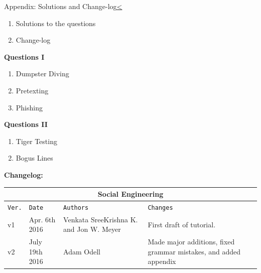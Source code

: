 \documentclass[12pt]{extarticle}
\newenvironment{instructionblock}{\Large\bgroup}{\egroup}
\newcommand{\ben}{\begin{enumerate}}
\newcommand{\een}{\end{enumerate}}
\begin{document}
\begin{slide}{Appendix: Solutions and Change-log}{\hyperref[slide 14]{\textless}}
	\begin{instructionblock}
		\begin{enumerate}
			\item {Solutions to the questions}
				
			\item {Change-log}
		\end{enumerate}
	\end{instructionblock}
\end{slide}

\textbf{Questions I}
\ben
	\item Dumpster Diving
	\item Pretexting
	\item Phishing 
\een

\textbf{Questions II}

\ben
	\item Tiger Testing
	\item Bogus Lines
\een

	
\textbf{Changelog:}
\label{changelog}
\vspace{6mm}


\begin{tabular}{ |p{1cm}|p{3cm}|p{3cm}|p{5cm}|  }
\hline
\multicolumn{4}{|c|}{Social Engineering} \\
\hline
\texttt{Ver.} & \texttt{Date} & \texttt{Authors} & \texttt{Changes} \\
\hline
v1 & Apr. 6th 2016 & Venkata SreeKrishna K. and Jon W. Meyer & First draft of tutorial. \\
\hline
v2 & July 19th 2016 & Adam Odell & Made major additions, fixed grammar mistakes, and added appendix \\
\hline
\end{tabular}

\pagebreak

\end{document}
